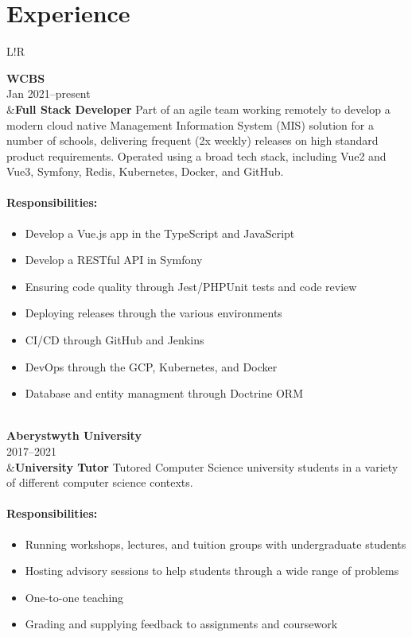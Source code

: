 \documentclass[10pt]{article}
\newcommand\VRule{\color{lightgray}\vrule width 0.5pt}
\begin{document}
\section*{Experience}
\begin{longtable}{L!{\VRule}R}

{\bf WCBS}\\
Jan 2021--present\\
&{\bf Full Stack Developer}\newline
Part of an agile team working remotely to develop a modern cloud native Management Information System (MIS) solution for a number of schools, delivering frequent (2x weekly) releases on high standard product requirements. Operated using a broad tech stack, including Vue2 and Vue3, Symfony, Redis, Kubernetes, Docker, and GitHub.

\vspace{-3mm}
\paragraph{Responsibilities:}
\begin{itemize}[noitemsep,topsep=0pt]
	\item Develop a Vue.js app in the TypeScript and JavaScript
	\item Develop a RESTful API in Symfony
	\item Ensuring code quality through Jest/PHPUnit tests and code review
	\item Deploying releases through the various environments
	\item CI/CD through GitHub and Jenkins
	\item DevOps through the GCP, Kubernetes, and Docker
	\item Database and entity managment through Doctrine ORM
\end{itemize}
\\

{\bf Aberystwyth University}\\
2017--2021\\
&{\bf University Tutor}\newline
Tutored Computer Science university students in a variety of different computer science contexts.

\vspace{-3mm}
\paragraph{Responsibilities:}
\begin{itemize}[noitemsep,topsep=0pt]
	\item Running workshops, lectures, and tuition groups with undergraduate students
	\item Hosting advisory sessions to help students through a wide range of problems
	\item One-to-one teaching
	\item Grading and supplying feedback to assignments and coursework
\end{itemize}
\\


\end{longtable}
\end{document}
